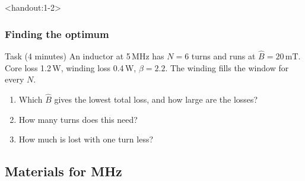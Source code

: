 \begin{frame}<handout:1-2>
	\frametitle{Finding the optimum}
	\begin{block}{Task (4 minutes)}
		An inductor at 5\,MHz has $N=6$ turns and runs at $\hat{B}=20$\,mT. Core loss 1.2\,W, winding loss 0.4\,W, $\beta=2.2$. The winding fills the window for every $N$.
		\begin{enumerate}
			\item Which $\hat{B}$ gives the lowest total loss, and how large are the losses?
			\item How many turns does this need?
			\item How much is lost with one turn less?
		\end{enumerate}
	\end{block}
\end{frame}

\subsection{Materials for MHz}


